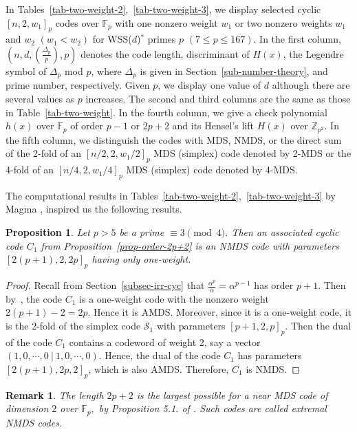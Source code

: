 \documentclass[12pt,reqno]{amsart}
\newtheorem{prop}{Proposition}
\newtheorem{rem}{Remark}
\newcommand{\F}{\mathbb{F}}
\begin{document}
In Tables~\ref{tab-two-weight-2},~\ref{tab-two-weight-3}, we display selected cyclic $[n, 2, w_1]_p$ codes over $\mathbb F_p$ with one nonzero weight $w_1$ or two nonzero weights $w_1$ and $w_2$ $(w_1 < w_2)$ for WSS($d$)$^*$ primes $p$ $(7 \le p \le 167)$. In the first column,
$(n, d, (\frac{\Delta_p}{p}), p)$ denotes the code length, discriminant of $H(x)$, the Legendre symbol of $\Delta_p$ mod $p$, where $\Delta_p$ is given in Section~\ref{sub-number-theory}, and prime number, respectively. Given $p$, we display one value of $d$ although there are several values as $p$ increases.
The second and third columns are the same as those in Table~\ref{tab-two-weight}.
In the fourth column, we give a check polynomial $h(x)$ over $\mathbb F_p$ of order $p-1$ or $2p+2$ and its Hensel's lift $H(x)$ over $\mathbb Z_{p^2}$.
 In the fifth column, we distinguish the codes with MDS, NMDS, or the direct sum of the 2-fold of an $[n/2, 2, w_1/2]_p$ MDS (simplex) code denoted by 2-MDS or the 4-fold of an $[n/4, 2, w_1/4]_p$ MDS (simplex) code denoted by 4-MDS.


\medskip

The computational results in Tables~\ref{tab-two-weight-2},~\ref{tab-two-weight-3} by Magma \cite{magma}, inspired us the following results.
\begin{prop}
Let $p>5$ be a prime $\equiv 3 \pmod{4}$. Then an associated cyclic code $C_1$ from Proposition~\ref{prop-order-2p+2} is an NMDS code with parameters $[2(p+1), 2, 2p]_p$ having only one-weight.
\end{prop}

\begin{proof}
Recall from Section~\ref{subsec-irr-cyc} that $\frac{\alpha^p}{\alpha} =\alpha^{p-1}$ has order $p+1$. Then by~\cite[Theorem 1]{SZS}, the code $C_1$ is a one-weight code with the nonzero weight $2(p+1) - 2= 2p$.
 Hence it is AMDS. Moreover, since it is a one-weight code, it is the 2-fold of the simplex code $\mathcal S_1$ with parameters $[p+1, 2, p]_p$. Then the dual of the code $C_1$ contains a codeword of weight 2, say a vector $(1, 0, \cdots, 0~ |~ 1, 0, \cdots, 0)$. Hence, the dual of the code $C_1$ has parameters $[2(p+1), 2p, 2]_p$, which is also AMDS. Therefore, $C_1$ is NMDS.
\end{proof}
\begin{rem}{\rm
The length $2p+2$ is the largest possible for a near MDS code of dimension $2$ over $\F_p,$ by Proposition 5.1. of \cite{DL}. Such codes are called extremal NMDS codes.
}
\end{rem}
\end{document}
